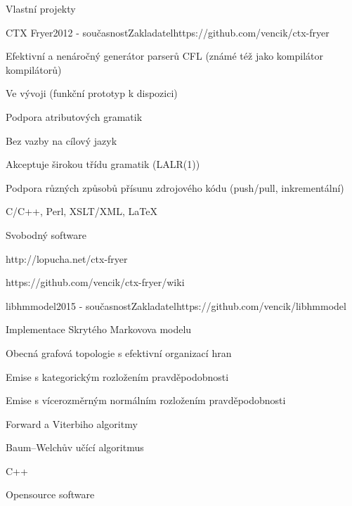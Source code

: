 \documentclass{resume} %
\begin{document}

\begin{rSection}{Vlastn\'{i} projekty}


\begin{rSubsection}{CTX Fryer}{2012 - sou\v{c}asnost}{Zakladatel}{https://github.com/vencik/ctx-fryer}
\item Efektivn\'{i} a nen\'{a}ro\v{c}n\'{y} gener\'{a}tor parser\r{u} CFL (zn\'{a}m\'{e} t\'{e}\v{z} jako kompil\'{a}tor kompil\'{a}tor\r{u})
\item Ve v\'{y}voji (funk\v{c}n\'{i} prototyp k dispozici)
\item Podpora atributov\'{y}ch gramatik
\item Bez vazby na c\'{i}lov\'{y} jazyk
\item Akceptuje \v{s}irokou t\v{r}\'{i}du gramatik (LALR(1))
\item Podpora r\r{u}zn\'{y}ch zp\r{u}sob\r{u} p\v{r}\'{i}sunu zdrojov\'{e}ho k\'{o}du (push/pull, inkrement\'{a}ln\'{i})
\item C/C++, Perl, XSLT/XML, \LaTeX
\item Svobodn\'{y} software
\item http://lopucha.net/ctx-fryer
\item https://github.com/vencik/ctx-fryer/wiki
\end{rSubsection}

\begin{rSubsection}{libhmmodel}{2015 - sou\v{c}asnost}{Zakladatel}{https://github.com/vencik/libhmmodel}
\item Implementace Skryt\'{e}ho Markovova modelu
\item Obecn\'{a} grafov\'{a} topologie s efektivn\'{i} organizac\'{i} hran
\item Emise s kategorick\'{y}m rozlo\v{z}en\'{i}m pravd\v{e}podobnosti
\item Emise s v\'{i}cerozm\v{e}rn\'{y}m norm\'{a}ln\'{i}m rozlo\v{z}en\'{i}m pravd\v{e}podobnosti
\item Forward a Viterbiho algoritmy
\item Baum--Welch\r{u}v u\v{c}\'{i}c\'{i} algoritmus
\item C++
\item Opensource software
\end{rSubsection}


\end{rSection}
\end{document}
